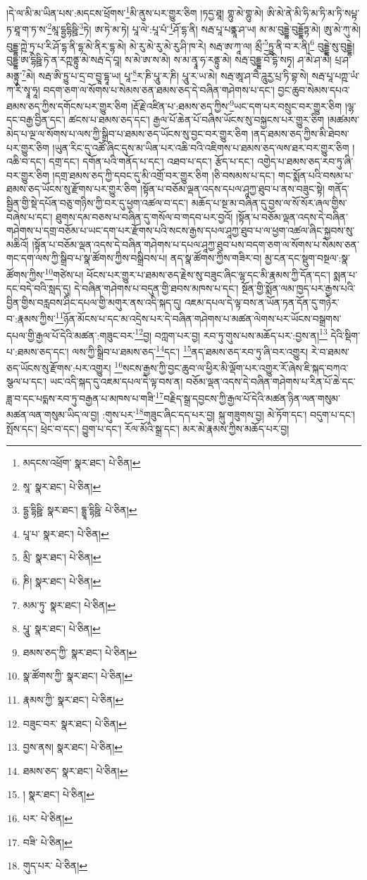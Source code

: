 །དེ་ལ་མི་མ་ཡིན་པས་:མདངས་ཕྲོགས་\footnote{མདངས་འཕྲོག་  སྣར་ཐང་།  པེ་ཅིན། }མི་ནུས་པར་གྱུར་ཅིག །ཏདྱ་ཐཱ། གྷུ་མེ་གྷུ་མེ། ཨི་མེ་ནེ་མི་ཧི་མ་ཏི་མ་ཏི་སཔྟ་ཏ་ཐཱ་ག་ཏ་ས་\footnote{སཱ་  སྣར་ཐང་།  པེ་ཅིན། }མཱ་དྷྱདྷིཥྛི་\footnote{དྷྱ་དྷིཥྛི་  སྣར་ཐང་། དྷྱཱ་དྷིཥྛི་  པེ་ཅིན། }ཏེ། ཨ་ཏེ་མ་ཏེ། པཱ་ལེ་:པཱ་པཾ་\footnote{པཱ་པ་  སྣར་ཐང་།  པེ་ཅིན། }ཤོ་དྷ་ནི། སརྦ་པཱ་པནྣཱ་ཤ་ཡ། མ་མ་བུདྡྷེ་བུདྡྷོཏྟ་མེ། ཨུ་མེ་ཀུ་མེ། བུདྡྷ་ཀྵེ་ཏྲ་པ་རི་ཤོ་དྷ་ནི་དྷ་མེ་ནིར་དྷ་མེ། མེ་རུ་མེ་རུ་མེ་རུ་ཤི་ཁ་རེ། སརྦ་ཨ་ཀཱ་ལ། མྲྀ་\footnote{མྲི་  སྣར་ཐང་།  པེ་ཅིན། }ཏྱུ་ནི་བ་ར་ནི།\footnote{ཎི།  སྣར་ཐང་།  པེ་ཅིན། } བུདྡྷེ་སུ་བུདྡྷེ། བུདྡྷ་ཨ་དྷིཥྛི་ཏེ་ན་རཀྵནྟུ་མེ་སརྦ་དེ་བཱ། ས་མེ་ཨ་ས་མེ། ས་མ་ནྭཱ་ཧ་རནྟུ་མེ། སརྦ་བུདྡྷ་བོ་དྷི་སཏྭ། ཤ་མེ་ཤ་མེ། པྲ་ཤ་མནྟུ་\footnote{མམ་ཏུ་  སྣར་ཐང་།  པེ་ཅིན། }མེ། སརྦ་ཨི་ཏྱུ་པ་དྲ་བ་བྱཱ་དྷཱ་ཡ། པཱ་\footnote{པཱུ་  སྣར་ཐང་།  པེ་ཅིན། }ར་ཎི་པཱུ་ར་ཎི། པཱུ་ར་ཡ་མེ། སརྦ་ཨཱ་ཤ་བཻ་ཌཱུརྱ་པྲ་ཏི་བྷ་སེ། སརྦ་པཱ་པཀྵ་ཡཾ་ཀ་རི་སྭཱ་ཧཱ། བདག་ཅག་ལ་སོགས་པ་སེམས་ཅན་ཐམས་ཅད་དེ་བཞིན་གཤེགས་པ་དང་། བྱང་ཆུབ་སེམས་དཔའ་ཐམས་ཅད་ཀྱིས་དགོངས་པར་གྱུར་ཅིག །རྡོ་རྗེ་འཛིན་པ་:ཐམས་ཅད་ཀྱིས་\footnote{ཐམས་ཅད་ཀྱི་  སྣར་ཐང་།  པེ་ཅིན། }ཡང་དག་པར་བསྲུང་བར་གྱུར་ཅིག །ལྷ་དང་བརྒྱ་བྱིན་དང་། ཚངས་པ་ཐམས་ཅད་དང་། རྒྱལ་པོ་ཆེན་པོ་བཞིས་ཡོངས་སུ་བསྐྱངས་པར་གྱུར་ཅིག །མཚམས་མེད་པ་ལྔ་ལ་སོགས་པ་ལས་ཀྱི་སྒྲིབ་པ་ཐམས་ཅད་ཡོངས་སུ་བྱང་བར་གྱུར་ཅིག །ནད་ཐམས་ཅད་ཀྱིས་མི་ཐེབས་པར་གྱུར་ཅིག །ཡུན་རིང་དུ་འཚོ་ཞིང་དུས་མ་ཡིན་པར་འཆི་བའི་འཇིགས་པ་ཐམས་ཅད་ལས་ཐར་བར་གྱུར་ཅིག །འཆི་བ་དང་། དགྲ་དང་། དགོན་པའི་གནོད་པ་དང་། འཐབ་པ་དང་། རྩོད་པ་དང་། འགྱེད་པ་ཐམས་ཅད་རབ་ཏུ་ཞི་བར་གྱུར་ཅིག །དགྲ་ཐམས་ཅད་ཀྱི་དབང་དུ་མི་འགྲོ་བར་གྱུར་ཅིག །ཅི་བསམས་པ་དང་། གང་སྨོན་པའི་བསམ་པ་ཐམས་ཅད་ཡོངས་སུ་རྫོགས་པར་གྱུར་ཅིག །སྟོན་པ་བཅོམ་ལྡན་འདས་དཔལ་ཤཱཀྱ་ཐུབ་པ་ནས་བཟུང་སྟེ། གནོད་སྦྱིན་གྱི་སྡེ་དཔོན་བཅུ་གཉིས་ཀྱི་བར་དུ་ཕྱག་འཚལ་བ་དང་། མཆོད་པ་སྔ་མ་བཞིན་དུ་བྱས་ལ་སོ་སོར་ཞལ་གྱིས་བཞེས་པ་དང་། ཐུགས་དམ་བཅས་པ་བཞིན་དུ་གསོལ་བ་གདབ་པར་བྱའོ། །སྟོན་པ་བཅོམ་ལྡན་འདས་དེ་བཞིན་གཤེགས་པ་དགྲ་བཅོམ་པ་ཡང་དག་པར་རྫོགས་པའི་སངས་རྒྱས་དཔལ་ཤཱཀྱ་ཐུབ་པ་ལ་ཕྱག་འཚལ་ཞིང་སྐྱབས་སུ་མཆིའོ། །སྟོན་པ་བཅོམ་ལྡན་འདས་དེ་བཞིན་གཤེགས་པ་དཔལ་ཤཱཀྱ་ཐུབ་པས་བདག་ཅག་ལ་སོགས་པ་སེམས་ཅན་གང་དག་ལས་ཀྱི་སྒྲིབ་པ་སྣ་ཚོགས་ཀྱིས་བསྒྲིབས་པ། ནད་སྣ་ཚོགས་ཀྱིས་གཟིར་བ། མྱ་ངན་དང་སྡུག་བསྔལ་:སྣ་ཚོགས་ཀྱིས་\footnote{སྣ་ཚོགས་ཀྱི་  སྣར་ཐང་།  པེ་ཅིན། }གཙེས་པ། ཕོངས་པར་གྱུར་པ་ཐམས་ཅད་རྗེས་སུ་བཟུང་ཞིང་ལྷ་དང་མི་རྣམས་ཀྱི་དོན་དང་། སྨན་པ་དང་བདེ་བའི་སླད་དུ། དེ་བཞིན་གཤེགས་པ་བདུན་གྱི་ཐབས་མཁས་པ་དང་། སྔོན་གྱི་སྨོན་ལམ་ཁྱད་པར་རྒྱས་པའི་བྱིན་གྱིས་བརླབས་ཤིང་དཔལ་གྱི་མགུར་ནས་འདི་སྐད་དུ། འཇམ་དཔལ་དེ་ལྟ་བས་ན་ཡོན་ཏན་དོན་དུ་གཉེར་བ་:རྣམས་ཀྱིས་\footnote{རྣམས་ཀྱི་  སྣར་ཐང་།  པེ་ཅིན། }ཉོན་མོངས་པ་དང་མ་འདྲེས་པར་དེ་བཞིན་གཤེགས་པ་མཚན་ལེགས་པར་ཡོངས་བསྒྲགས་དཔལ་གྱི་རྒྱལ་པོ་དེའི་མཚན་:གཟུང་བར་\footnote{བཟུང་བར་  སྣར་ཐང་།  པེ་ཅིན། }བྱ། བཀླག་པར་བྱ། རབ་ཏུ་གུས་པས་མཆོད་པར་:བྱས་ན།\footnote{བྱས་ནས།  སྣར་ཐང་།  པེ་ཅིན། } དེའི་སྡིག་པ་:ཐམས་ཅད་དང་། ལས་ཀྱི་སྒྲིབ་པ་ཐམས་ཅད་\footnote{ཐམས་ཅད་  སྣར་ཐང་།  པེ་ཅིན། }དང་། \footnote{།  སྣར་ཐང་།  པེ་ཅིན། }ནད་ཐམས་ཅད་རབ་ཏུ་ཞི་བར་འགྱུར། རེ་བ་ཐམས་ཅད་ཡོངས་སུ་རྫོགས་:པར་འགྱུར། \footnote{པར་  པེ་ཅིན། }སངས་རྒྱས་ཀྱི་བྱང་ཆུབ་ལ་ཕྱིར་མི་ལྡོག་པར་འགྱུར་རོ་ཞེས་ཇི་སྐད་བཀའ་སྩལ་པ་དང་། ཡང་འདི་སྐད་དུ་འཇམ་དཔལ་དེ་ལྟ་བས་ན། བཅོམ་ལྡན་འདས་དེ་བཞིན་གཤེགས་པ་རིན་པོ་ཆེ་དང་ཟླ་བ་དང་པདྨས་རབ་ཏུ་བརྒྱན་པ་མཁས་པ་གཟི་\footnote{བཟི་  པེ་ཅིན། }བརྗིད་སྒྲ་དབྱངས་ཀྱི་རྒྱལ་པོ་དེའི་མཚན་ཉིན་ལན་གསུམ་མཚན་ལན་གསུམ་ཡིད་ལ་བྱ། :གུས་པར་\footnote{གུད་པར་  པེ་ཅིན། }གཟུང་ཞིང་དད་པར་བྱ། སྐུ་གཟུགས་བྱ། མེ་ཏོག་དང་། བདུག་པ་དང་། སྤོས་དང་། ཕྲེང་བ་དང་། བྱུག་པ་དང་། རོལ་མོའི་སྒྲ་དང་། མར་མེ་རྣམས་ཀྱིས་མཆོད་པར་བྱ། 